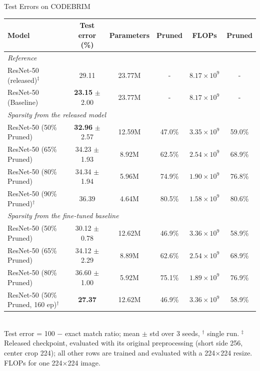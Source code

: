 \begin{table}[t]
\centering
{\small Test Errors on CODEBRIM}\\[2pt]
\begin{tabular}{l|c|c|c|c|c}
\hline
Model & Test error (\%) & Parameters & Pruned & FLOPs & Pruned \\
\hline
\multicolumn{6}{l}{\textit{Reference}} \\
ResNet-50 (released)$^\ddagger$ & 29.11 & 23.77M & - & $8.17\times10^{9}$ & - \\
ResNet-50 (Baseline) & \textbf{23.15} {\scriptsize$\pm$2.00} & 23.77M & - & $8.17\times10^{9}$ & - \\
\hline
\multicolumn{6}{l}{\textit{Sparsity from the released model}} \\
ResNet-50 (50\% Pruned) & \textbf{32.96} {\scriptsize$\pm$2.57} & 12.59M & 47.0\% & $3.35\times10^{9}$ & 59.0\% \\
ResNet-50 (65\% Pruned) & 34.23 {\scriptsize$\pm$1.93} & 8.92M & 62.5\% & $2.54\times10^{9}$ & 68.9\% \\
ResNet-50 (80\% Pruned) & 34.34 {\scriptsize$\pm$1.94} & 5.96M & 74.9\% & $1.90\times10^{9}$ & 76.8\% \\
ResNet-50 (90\% Pruned)$^\dagger$ & 36.39 & 4.64M & 80.5\% & $1.58\times10^{9}$ & 80.6\% \\
\hline
\multicolumn{6}{l}{\textit{Sparsity from the fine-tuned baseline}} \\
ResNet-50 (50\% Pruned) & 30.12 {\scriptsize$\pm$0.78} & 12.62M & 46.9\% & $3.36\times10^{9}$ & 58.9\% \\
ResNet-50 (65\% Pruned) & 34.12 {\scriptsize$\pm$2.29} & 8.89M & 62.6\% & $2.54\times10^{9}$ & 68.9\% \\
ResNet-50 (80\% Pruned) & 36.60 {\scriptsize$\pm$1.00} & 5.92M & 75.1\% & $1.89\times10^{9}$ & 76.9\% \\
ResNet-50 (50\% Pruned, 160 ep)$^\dagger$ & \textbf{27.37} & 12.62M & 46.9\% & $3.36\times10^{9}$ & 58.9\% \\
\hline
\end{tabular}
\\[2pt]
{\scriptsize Test error = 100 $-$ exact match ratio; mean $\pm$ std over 3 seeds, $^\dagger$ single run. $^\ddagger$ Released checkpoint, evaluated with its original preprocessing (short side 256, center crop 224); all other rows are trained and evaluated with a 224$\times$224 resize.  FLOPs for one 224$\times$224 image.}
\end{table}
